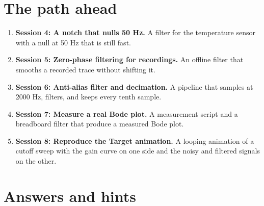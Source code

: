 \documentclass[11pt,a4paper]{article}
\begin{document}
\section{The path ahead}
\begin{enumerate}[nosep]
\item \textbf{Session 4: A notch that nulls 50 Hz.} A filter for the temperature sensor with a null at 50 Hz that is still fast.
\item \textbf{Session 5: Zero-phase filtering for recordings.} An offline filter that smooths a recorded trace without shifting it.
\item \textbf{Session 6: Anti-alias filter and decimation.} A pipeline that samples at 2000 Hz, filters, and keeps every tenth sample.
\item \textbf{Session 7: Measure a real Bode plot.} A measurement script and a breadboard filter that produce a measured Bode plot.
\item \textbf{Session 8: Reproduce the Target animation.} A looping animation of a cutoff sweep with the gain curve on one side and the noisy and filtered signals on the other.
\end{enumerate}

\section{Answers and hints}
\end{document}
